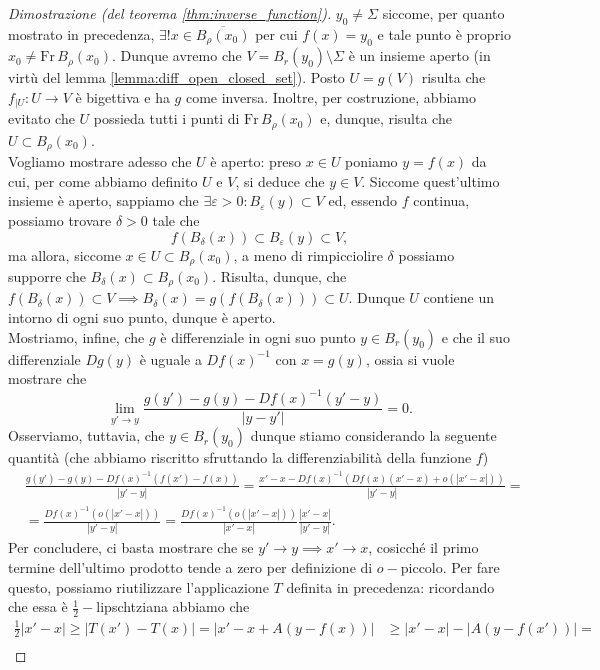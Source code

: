 \begin{proof}[Dimostrazione (del teorema \ref{thm:inverse_function})]
    $y_0 \neq \Sigma$ siccome, per quanto mostrato in precedenza, $\exists ! x \in \overline{B_\rho(x_0)}$ per cui $f(x) = y_0$ e tale punto è proprio $x_0 \neq \text{Fr} \, B_\rho(x_0)$. Dunque avremo che $V = B_r(y_0) \setminus \Sigma$ è un insieme aperto (in virtù del lemma \ref{lemma:diff_open_closed_set}). Posto $U = g(V)$ risulta che $f_{|U} : U \to V$ è bigettiva
    e ha $g$ come inversa. Inoltre, per costruzione, abbiamo evitato che $U$ possieda tutti i punti di $\text{Fr} \, B_\rho(x_0)$ e, dunque, risulta che $U \subset B_\rho(x_0)$. \\
    Vogliamo mostrare adesso che $U$ è aperto: preso $x \in U$ poniamo $y = f(x)$ da cui, per come abbiamo definito $U$ e $V$, si deduce che $y \in V$. Siccome quest'ultimo insieme è aperto, sappiamo che $\exists \varepsilon > 0: B_\varepsilon(y) \subset V$ ed, essendo $f$ continua, possiamo trovare $\delta > 0$ tale che
    $$
    f(B_\delta(x)) \subset B_\varepsilon(y) \subset V,
    $$
    ma allora, siccome $x \in U \subset B_\rho(x_0)$, a meno di rimpicciolire $\delta$ possiamo supporre che $B_\delta(x) \subset B_\rho(x_0)$. Risulta, dunque, che $f(B_\delta(x)) \subset V \implies B_\delta(x) = g(f(B_\delta(x))) \subset U$. Dunque $U$ contiene un intorno di ogni suo punto, dunque è aperto. \\
    Mostriamo, infine, che $g$ è differenziale in ogni suo punto $y \in B_r(y_0)$ e che il suo differenziale $Dg(y)$ è uguale a $Df(x)^{-1}$ con $x = g(y)$, ossia si vuole mostrare che
    $$
        \lim_{y' \to y} \frac{g(y') - g(y) - Df(x)^{-1}(y'-y)}{|y-y'|} = 0.
    $$
    Osserviamo, tuttavia, che $y \in B_r(y_0)$ dunque stiamo considerando la seguente quantità (che abbiamo riscritto sfruttando la differenziabilità della funzione $f$)
    \begin{align*}
    &\frac{g(y') - g(y) - Df(x)^{-1}(f(x')-f(x))}{|y' - y|} = \frac{x' - x - Df(x)^{-1}(Df(x)(x'-x) + o(|x' - x|))}{|y' - y|} = \\
    &=\frac{Df(x)^{-1}(o(|x'-x|))}{|y'-y|} = \frac{Df(x)^{-1}(o(|x'-x|))}{|x'-x|} \frac{|x'-x|}{|y'-y|}.
    \end{align*}
    Per concludere, ci basta mostrare che se $y' \to y \implies x' \to x$, cosicché il primo termine dell'ultimo prodotto tende a zero per definizione di $o-$piccolo. Per fare questo, possiamo riutilizzare
    l'applicazione $T$ definita in precedenza: ricordando che essa è $\frac{1}{2}-$lipschtziana abbiamo che
    \begin{align*}
    \frac{1}{2} |x' - x| \geq  |T(x') - T(x)| = |x' - x + A(y - f(x))| &\geq |x' - x| - |A(y - f(x'))| = & \\

\end{align*}
\end{proof}
